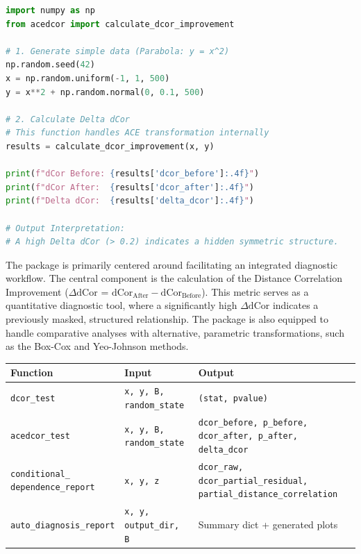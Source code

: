 \documentclass[a4paper,fleqn]{cas-sc}
\newcommand{\dCor}{\mathrm{dCor}}
\begin{document}
\begin{lstlisting}[language=Python, caption={Basic usage of acedcor to calculate $\Delta\dCor$.}, label={list:basic_usage}]
import numpy as np
from acedcor import calculate_dcor_improvement

# 1. Generate simple data (Parabola: y = x^2)
np.random.seed(42)
x = np.random.uniform(-1, 1, 500)
y = x**2 + np.random.normal(0, 0.1, 500)

# 2. Calculate Delta dCor
# This function handles ACE transformation internally
results = calculate_dcor_improvement(x, y)

print(f"dCor Before: {results['dcor_before']:.4f}")
print(f"dCor After:  {results['dcor_after']:.4f}")
print(f"Delta dCor:  {results['delta_dcor']:.4f}")

# Output Interpretation:
# A high Delta dCor (> 0.2) indicates a hidden symmetric structure.
\end{lstlisting}

The package is primarily centered around facilitating an integrated diagnostic workflow. The central component is the calculation of the Distance Correlation Improvement ($\Delta\dCor$ = $\dCor_{\text{After}} - \dCor_{\text{Before}}$). This metric serves as a quantitative diagnostic tool, where a significantly high $\Delta\dCor$ indicates a previously masked, structured relationship. The package is also equipped to handle comparative analyses with alternative, parametric transformations, such as the Box-Cox and Yeo-Johnson methods.

\begin{center}
\label{tab:v3_io_schema}
\begin{tabular}{@{}p{}p{}p{}@{}}
\toprule
Function & Input & Output \\ \midrule
\texttt{dcor\_test} & \texttt{x, y, B, random\_state} & \texttt{(stat, pvalue)} \\
\texttt{acedcor\_test} & \texttt{x, y, B, random\_state} & \texttt{dcor\_before, p\_before, dcor\_after, p\_after, delta\_dcor} \\
\makecell[l]{\texttt{conditional\_}\\\texttt{dependence\_report}} & \texttt{x, y, z} & \makecell[l]{\texttt{dcor\_raw, dcor\_partial\_residual,}\\\texttt{partial\_distance\_correlation}} \\
\texttt{auto\_diagnosis\_report} & \texttt{x, y, output\_dir, B} & Summary dict + generated plots \\ \bottomrule
\end{tabular}
\end{center}
\end{document}
